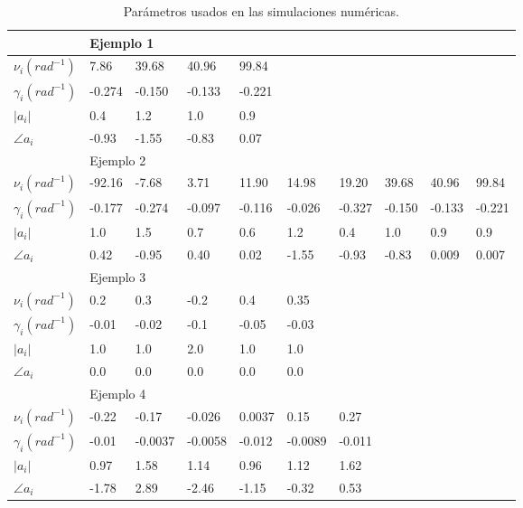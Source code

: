 \begin{table}
	\centering
	\begin{tabular}{l|lllllllll}
		& \multicolumn{9}{l}{Ejemplo 1 \cite{Andersson2014}}                                                     \\ \hline
		$\nu_i(rad^{-1})$    & 7.86   & 39.68   & 40.96   & 99.84  &         &        &        &        &        \\
		$\gamma_i(rad^{-1})$ & -0.274 & -0.150  & -0.133  & -0.221 &         &        &        &        &        \\
		$|a_i|$              & 0.4    & 1.2     & 1.0     & 0.9    &         &        &        &        &        \\
		$\angle a_i$         & -0.93  & -1.55   & -0.83   & 0.07   &         &        &        &        &        \\ \hline
		& \multicolumn{9}{l}{Ejemplo 2 \cite{Andersson2014}}                                                     \\ \hline
		$\nu_i(rad^{-1})$    & -92.16 & -7.68   & 3.71    & 11.90  & 14.98   & 19.20  & 39.68  & 40.96  & 99.84  \\
		$\gamma_i(rad^{-1})$ & -0.177 & -0.274  & -0.097  & -0.116 & -0.026  & -0.327 & -0.150 & -0.133 & -0.221 \\
		$|a_i|$              & 1.0    & 1.5     & 0.7     & 0.6    & 1.2     & 0.4    & 1.0    & 0.9    & 0.9    \\
		$\angle a_i$         & 0.42   & -0.95   & 0.40    & 0.02   & -1.55   & -0.93  & -0.83  & 0.009  & 0.007  \\ \hline
		& \multicolumn{9}{l}{Ejemplo 3 \cite{Papy2007}}                                                     \\ \hline
		$\nu_i(rad^{-1})$    & 0.2    & 0.3     & -0.2    & 0.4    & 0.35    &        &        &        &        \\
		$\gamma_i(rad^{-1})$ & -0.01  & -0.02   & -0.1    & -0.05  & -0.03   &        &        &        &        \\
		$|a_i|$              & 1.0    & 1.0     & 2.0     & 1.0    & 1.0     &        &        &        &        \\
		$\angle a_i$         & 0.0    & 0.0     & 0.0     & 0.0    & 0.0     &        &        &        &        \\ \hline
		& \multicolumn{9}{l}{Ejemplo 4 \cite{Albert2021}}                                                     \\ \hline
		$\nu_i(rad^{-1})$    & -0.22  & -0.17   & -0.026  & 0.0037 & 0.15    & 0.27   &        &        &        \\
		$\gamma_i(rad^{-1})$ & -0.01  & -0.0037 & -0.0058 & -0.012 & -0.0089 & -0.011 &        &        &        \\
		$|a_i|$              & 0.97   & 1.58    & 1.14    & 0.96   & 1.12    & 1.62   &        &        &        \\
		$\angle a_i$         & -1.78  & 2.89    & -2.46   & -1.15  & -0.32   & 0.53   &        &        &        \\ \hline
	\end{tabular}
	\caption{Parámetros usados en las simulaciones numéricas.}
	\label{tab:ejemplo}
\end{table}
